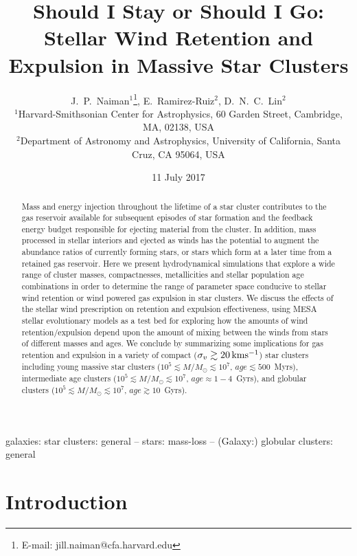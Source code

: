 \documentclass[fleqn,usenatbib]{mnras}
\title[Star Cluster Stellar Wind Retention \& Expulsion]{Should I Stay or Should I Go:  Stellar Wind Retention and Expulsion in Massive Star Clusters}
\author[J.~P.~Naiman et al.]{J.~P.~Naiman$^{1}$\thanks{E-mail: jill.naiman@cfa.harvard.edu}, E.~Ramirez-Ruiz$^{2}$, D.~N.~C.~Lin$^{2}$ 
\vspace*{0.2cm} \\
$^{1}$Harvard-Smithsonian Center for Astrophysics, 60 Garden Street, Cambridge, MA, 02138, USA\\
  $^2$Department of Astronomy and Astrophysics, University of California, Santa Cruz, CA 95064, USA
}
\date{11 July 2017}
\begin{document}
\label{firstpage}
\pagerange{\pageref{firstpage}--\pageref{lastpage}}
\maketitle



\begin{abstract}
Mass and energy injection throughout the lifetime of a star cluster contributes to the gas reservoir available for subsequent episodes of star formation and the feedback energy budget responsible for ejecting material from the cluster.
In addition, mass processed in stellar interiors and ejected as winds has the potential to augment the abundance ratios of currently forming stars, or stars which form at a later time from a retained gas reservoir.
Here we present hydrodynamical simulations that explore a wide range of cluster masses, compactnesses, metallicities and stellar population age combinations in order to determine the range of parameter space conducive to stellar wind retention or wind powered gas expulsion in star clusters.
We discuss the effects of the stellar wind prescription on retention and expulsion effectiveness, using MESA stellar evolutionary models as a test bed for exploring how the amounts of wind retention/expulsion depend upon the amount of mixing between the winds from stars of different masses and ages.
We conclude by summarizing some implications for gas retention and expulsion in a variety of compact ($\sigma_v \gtrsim 20 \, {\rm km s^{-1}}$) star clusters including young massive star clusters ($10^5 \lesssim M/M_\odot \lesssim 10^7$, $age \lesssim 500$~Myrs), intermediate age clusters ($10^5 \lesssim M/M_\odot \lesssim 10^7$, $age \approx 1-4$~Gyrs), and globular clusters ($10^5 \lesssim M/M_\odot \lesssim 10^7$, $age \gtrsim 10$~Gyrs).
\end{abstract}

\begin{keywords}
galaxies: star clusters: general -- stars: mass-loss -- (Galaxy:) globular clusters: general\end{keywords}




\section{Introduction}
 
\end{document}
